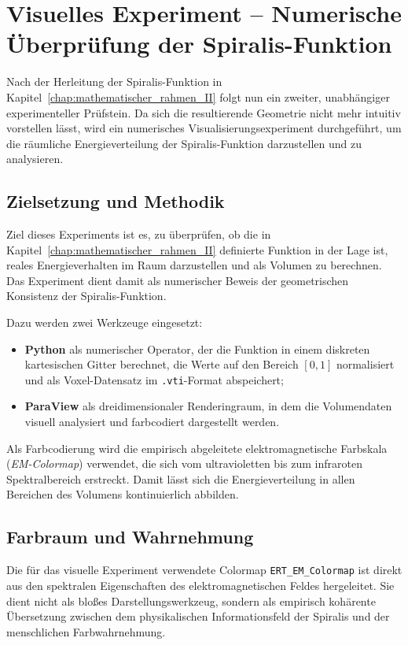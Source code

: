 \chapter{Visuelles Experiment – Numerische Überprüfung der Spiralis-Funktion}
\label{chap:visualisierung}

Nach der Herleitung der Spiralis-Funktion in Kapitel~\ref{chap:mathematischer_rahmen_II}
folgt nun ein zweiter, unabhängiger experimenteller Prüfstein.
Da sich die resultierende Geometrie nicht mehr intuitiv vorstellen lässt,
wird ein numerisches Visualisierungsexperiment durchgeführt, um die räumliche
Energieverteilung der Spiralis-Funktion darzustellen und zu analysieren.

\section{Zielsetzung und Methodik}

Ziel dieses Experiments ist es, zu überprüfen, ob die in Kapitel~\ref{chap:mathematischer_rahmen_II}
definierte Funktion in der Lage ist, reales Energieverhalten im Raum
darzustellen und als Volumen zu berechnen.
Das Experiment dient damit als numerischer Beweis der geometrischen Konsistenz
der Spiralis-Funktion.

Dazu werden zwei Werkzeuge eingesetzt:
\begin{itemize}
  \item \textbf{Python} als numerischer Operator, der die Funktion in einem
        diskreten kartesischen Gitter berechnet, die Werte auf den Bereich
        $[0,1]$ normalisiert und als Voxel-Datensatz im \texttt{.vti}-Format
        abspeichert;
  \item \textbf{ParaView} als dreidimensionaler Renderingraum, in dem die
        Volumendaten visuell analysiert und farbcodiert dargestellt werden.
\end{itemize}

Als Farbcodierung wird die empirisch abgeleitete elektromagnetische Farbskala
(\emph{EM-Colormap}) verwendet, die sich vom ultravioletten bis zum
infraroten Spektralbereich erstreckt.
Damit lässt sich die Energieverteilung in allen Bereichen des Volumens
kontinuierlich abbilden.

\section{Farbraum und Wahrnehmung}

Die für das visuelle Experiment verwendete Colormap \texttt{ERT\_EM\_Colormap} 
ist direkt aus den spektralen Eigenschaften des elektromagnetischen Feldes 
hergeleitet. Sie dient nicht als bloßes Darstellungswerkzeug, 
sondern als empirisch kohärente Übersetzung zwischen 
dem physikalischen Informationsfeld der Spiralis 
und der menschlichen Farbwahrnehmung.

